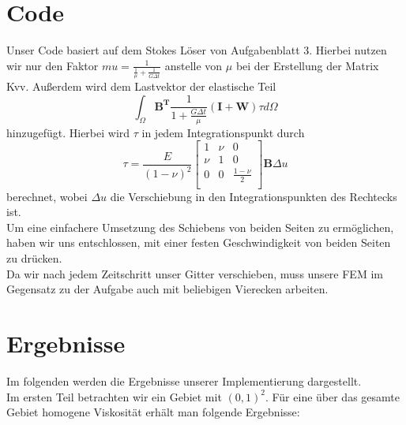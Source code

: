 \documentclass[12pt]{article}
\begin{document}
\section{Code}
Unser Code basiert auf dem Stokes Löser von Aufgabenblatt 3. Hierbei nutzen wir nur den Faktor $mu=\frac{1}{\frac{1}{\mu}+\frac{1}{G\Delta t}}$ anstelle von $\mu$ bei der Erstellung der Matrix Kvv. Außerdem wird dem Lastvektor der elastische Teil
\begin{equation*}
	\int_{\Omega}^{} \boldsymbol{B^T} \frac{1}{1+\frac{G\Delta t}{\mu}}(\boldsymbol{I}+\boldsymbol{W})\tau d\Omega
\end{equation*}
hinzugefügt. Hierbei wird $\tau$ in jedem Integrationspunkt durch
\begin{equation*}
	\tau = \frac{E}{(1-\nu)^2} \begin{bmatrix}
	1 & \nu & 0 \\
	\nu & 1 & 0 \\
	0 & 0 & \frac{1-\nu}{2} \\
	\end{bmatrix}
	\boldsymbol{B}\Delta u
\end{equation*}
berechnet, wobei $\Delta u$ die Verschiebung in den Integrationspunkten des Rechtecks ist. \\
Um eine einfachere Umsetzung des Schiebens von beiden Seiten zu ermöglichen, haben wir uns entschlossen, mit einer festen Geschwindigkeit von beiden Seiten zu drücken. \\
Da wir nach jedem Zeitschritt unser Gitter verschieben, muss unsere FEM im Gegensatz zu der Aufgabe auch mit beliebigen Vierecken arbeiten.

\section{Ergebnisse}
Im folgenden werden die Ergebnisse unserer Implementierung dargestellt. \\
\newline
Im ersten Teil betrachten wir ein Gebiet mit $(0,1)^2$. Für eine über das gesamte Gebiet homogene Viskosität erhält man folgende Ergebnisse: \\
\end{document}

